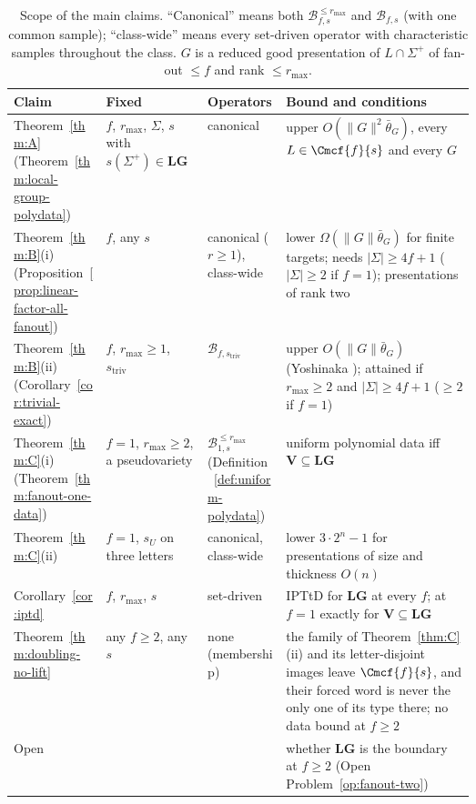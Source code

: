 \begin{table}[htbp]
\caption{Scope of the main claims.  ``Canonical'' means both
$\mathcal B^{\le r_{\max}}_{f,s}$ and $\mathcal B_{f,s}$ (with one common sample);
``class-wide'' means every set-driven operator with characteristic samples
throughout the class.  $G$ is a reduced good presentation of $L\cap\Sigma^+$ of
fan-out $\le f$ and rank $\le r_{\max}$.}
\label{tab:scope}
\centering
\footnotesize
\setlength{\tabcolsep}{3pt}
\renewcommand{\arraystretch}{1.15}
\begin{tabularx}{\linewidth}{@{}>{\raggedright\arraybackslash}p{0.2\linewidth}>{\raggedright\arraybackslash}p{0.22\linewidth}>{\raggedright\arraybackslash}p{0.17\linewidth}>{\raggedright\arraybackslash}X@{}}
\hline
Claim & Fixed & Operators & Bound and conditions\\
\hline
Theorem~\ref{thm:A} (Theorem~\ref{thm:local-group-polydata})
 & $f$, $r_{\max}$, $\Sigma$, $s$ with $s(\Sigma^+)\in\mathbf{LG}$
 & canonical
 & upper $O(\|G\|^2\bar\theta_G)$, every $L\in\Cmcf{f}{s}$ and every $G$\\
Theorem~\ref{thm:B}(i) (Proposition~\ref{prop:linear-factor-all-fanout})
 & $f$, any $s$
 & canonical ($r\ge1$), class-wide
 & lower $\Omega(\|G\|\bar\theta_G)$ for finite targets; needs $|\Sigma|\ge4f+1$ ($|\Sigma|\ge2$ if $f=1$);
   presentations of rank two\\
Theorem~\ref{thm:B}(ii) (Corollary~\ref{cor:trivial-exact})
 & $f$, $r_{\max}\ge1$, $s_{\mathrm{triv}}$
 & $\mathcal B_{f,s_{\mathrm{triv}}}$
 & upper $O(\|G\|\bar\theta_G)$ (Yoshinaka \cite{Yoshinaka2011}); attained if $r_{\max}\ge2$ and $|\Sigma|\ge4f+1$ ($\ge2$ if $f=1$)\\
Theorem~\ref{thm:C}(i) (Theorem~\ref{thm:fanout-one-data})
 & $f=1$, $r_{\max}\ge2$, a pseudovariety
 & $\mathcal B^{\le r_{\max}}_{1,s}$ (Definition~\ref{def:uniform-polydata})
 & uniform polynomial data iff $\mathbf V\subseteq\mathbf{LG}$\\
Theorem~\ref{thm:C}(ii)
  & $f=1$, $s_U$ on three letters
 & canonical, class-wide
 & lower $3\cdot2^n-1$ for presentations of size and thickness $O(n)$\\
Corollary~\ref{cor:iptd}
 & $f$, $r_{\max}$, $s$
 & set-driven
 & IPTtD for $\mathbf{LG}$ at every $f$; at $f=1$ exactly for $\mathbf{V}\subseteq\mathbf{LG}$\\
Theorem~\ref{thm:doubling-no-lift}
 & any $f\ge2$, any $s$
 & none (membership)
  & the family of Theorem~\ref{thm:C}(ii) and its letter-disjoint images leave $\Cmcf{f}{s}$, and their forced word is never the only one of its type there; no data bound at $f\ge2$\\
Open
 & 
 & 
 & whether $\mathbf{LG}$ is the boundary at $f\ge2$ (Open Problem~\ref{op:fanout-two})\\
\hline
\end{tabularx}
\end{table}

